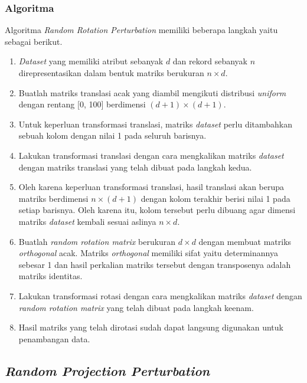 \subsubsection{Algoritma}
\label{subsubsec:algo-rotation}

Algoritma \textit{Random Rotation Perturbation} memiliki beberapa langkah yaitu sebagai berikut.
\begin{enumerate}
    \item \textit{Dataset} yang memiliki atribut sebanyak \(d\) dan rekord sebanyak \(n\) direpresentasikan dalam bentuk matriks berukuran \(n \times d\).
    \item Buatlah matriks translasi acak yang diambil mengikuti distribusi \textit{uniform} dengan rentang [0, 100] berdimensi \((d+1)\times(d+1)\).
    \item Untuk keperluan transformasi translasi, matriks \textit{dataset} perlu ditambahkan sebuah kolom dengan nilai 1 pada seluruh barisnya.
    \item Lakukan transformasi translasi dengan cara mengkalikan matriks \textit{dataset} dengan matriks translasi yang telah dibuat pada langkah kedua.
    \item Oleh karena keperluan transformasi translasi, hasil translasi akan berupa matriks berdimensi \(n\times(d+1)\) dengan kolom terakhir berisi nilai 1 pada setiap barisnya. Oleh karena itu, kolom tersebut perlu dibuang agar dimensi matriks \textit{dataset} kembali sesuai aslinya \(n \times d\).
    \item Buatlah \textit{random rotation matrix} berukuran \(d \times d\) dengan membuat matriks \textit{orthogonal} acak. Matriks \textit{orthogonal} memiliki sifat yaitu determinannya sebesar 1 dan hasil perkalian matriks tersebut dengan transposenya adalah matriks identitas.
    \item Lakukan transformasi rotasi dengan cara mengkalikan matriks \textit{dataset} dengan \textit{random rotation matrix} yang telah dibuat pada langkah keenam.
    \item Hasil matriks yang telah dirotasi sudah dapat langsung digunakan untuk penambangan data.
\end{enumerate}

\subsection{\textit{Random Projection Perturbation}}
\label{subsec:rpp}

